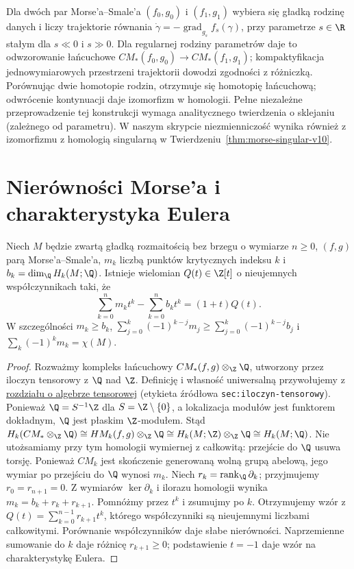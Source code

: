 \begin{uwaga}
Dla dwóch par Morse'a--Smale'a $(f_0,g_0)$ i $(f_1,g_1)$
wybiera się gładką rodzinę danych i liczy trajektorie równania
$\dot\gamma=-\operatorname{grad}_{g_s}f_s(\gamma)$,
przy parametrze $s\in\R$ stałym dla $s\ll0$ i $s\gg0$.
Dla regularnej rodziny parametrów daje to odwzorowanie łańcuchowe
$CM_*(f_0,g_0)\to CM_*(f_1,g_1)$; kompaktyfikacja
jednowymiarowych przestrzeni trajektorii dowodzi zgodności
z różniczką. Porównując dwie homotopie rodzin,
otrzymuje się homotopię łańcuchową; odwrócenie
kontynuacji daje izomorfizm w homologii.
Pełne niezależne przeprowadzenie tej konstrukcji
wymaga analitycznego twierdzenia o sklejaniu
(zależnego od parametru). W naszym skrypcie
niezmienniczość wynika również z izomorfizmu
z homologią singularną w Twierdzeniu~\ref{thm:morse-singular-v10}.
\end{uwaga}

\section{Nierówności Morse'a i charakterystyka Eulera}
\begin{twierdzenie}
\label{thm:morse-inequalities-v10}
Niech $M$ będzie zwartą gładką rozmaitością
bez brzegu o wymiarze $n\ge0$, $(f,g)$
parą Morse'a--Smale'a, $m_k$ liczbą punktów krytycznych
indeksu $k$ i $b_k=\dim_\Q H_k(M;\Q)$.
Istnieje wielomian $Q(t)\in\Z[t]$ o nieujemnych współczynnikach taki, że
\[
\sum_{k=0}^{n}m_kt^k-\sum_{k=0}^{n}b_kt^k=(1+t)Q(t).
\]
W szczególności $m_k\ge b_k$,
$\sum_{j=0}^k(-1)^{k-j}m_j\ge
\sum_{j=0}^k(-1)^{k-j}b_j$ i
$\sum_k(-1)^km_k=\chi(M)$.
\end{twierdzenie}
\begin{proof}
Rozważmy kompleks łańcuchowy $CM_*(f,g)\otimes_{\Z}\Q$,
utworzony przez iloczyn tensorowy z $\Q$ nad $\Z$.
Definicję i własność uniwersalną przywołujemy z
\href{https://github.com/dariusz-piekarz/mathematical_scipts/blob/biblioteka-matematyczna-iteracja-6/chapters/pl/differential_geometry_and_topology/03-algebra-tensorowa-i-zewnetrzna.tex}{rozdziału o algebrze tensorowej}
(etykieta źródłowa \texttt{sec:iloczyn-tensorowy}).
Ponieważ $\Q=S^{-1}\Z$ dla $S=\Z\setminus\{0\}$,
a lokalizacja modułów jest funktorem dokładnym,
$\Q$ jest płaskim $\Z$-modułem. Stąd
$H_k(CM_*\otimes_{\Z}\Q)\cong HM_k(f,g)\otimes_{\Z}\Q
\cong H_k(M;\Z)\otimes_{\Z}\Q\cong H_k(M;\Q)$.
Nie utożsamiamy przy tym homologii wymiernej
z całkowitą: przejście do $\Q$ usuwa torsję.
Ponieważ $CM_k$ jest skończenie generowaną wolną grupą abelową,
jego wymiar po przejściu do $\Q$ wynosi $m_k$.
Niech
$r_k=\operatorname{rank}_\Q\partial_k$; przyjmujemy $r_0=r_{n+1}=0$.
Z wymiarów $\ker\partial_k$ i ilorazu homologii wynika
$m_k=b_k+r_k+r_{k+1}$. Pomnóżmy przez $t^k$
i zsumujmy po $k$. Otrzymujemy wzór z
$Q(t)=\sum_{k=0}^{n-1}r_{k+1}t^k$, którego współczynniki
są nieujemnymi liczbami całkowitymi.
Porównanie współczynników daje słabe nierówności.
Naprzemienne sumowanie do $k$ daje różnicę $r_{k+1}\ge0$;
podstawienie $t=-1$ daje wzór na charakterystykę Eulera.
\end{proof}

